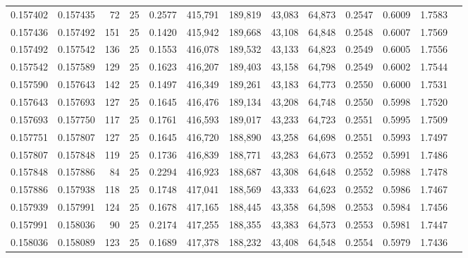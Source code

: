 \begin{tabular}{rrrrrrrrrrrrr}
0.157402 & 0.157435 &    72 &  25 &                                     0.2577 & 415,791 & 189,819 &  43,083 &  64,873 & 0.2547 & 0.6009 & 1.7583 \\
0.157436 & 0.157492 &   151 &  25 &                                     0.1420 & 415,942 & 189,668 &  43,108 &  64,848 & 0.2548 & 0.6007 & 1.7569 \\
0.157492 & 0.157542 &   136 &  25 &                                     0.1553 & 416,078 & 189,532 &  43,133 &  64,823 & 0.2549 & 0.6005 & 1.7556 \\
0.157542 & 0.157589 &   129 &  25 &                                     0.1623 & 416,207 & 189,403 &  43,158 &  64,798 & 0.2549 & 0.6002 & 1.7544 \\
0.157590 & 0.157643 &   142 &  25 &                                     0.1497 & 416,349 & 189,261 &  43,183 &  64,773 & 0.2550 & 0.6000 & 1.7531 \\
0.157643 & 0.157693 &   127 &  25 &                                     0.1645 & 416,476 & 189,134 &  43,208 &  64,748 & 0.2550 & 0.5998 & 1.7520 \\
0.157693 & 0.157750 &   117 &  25 &                                     0.1761 & 416,593 & 189,017 &  43,233 &  64,723 & 0.2551 & 0.5995 & 1.7509 \\
0.157751 & 0.157807 &   127 &  25 &                                     0.1645 & 416,720 & 188,890 &  43,258 &  64,698 & 0.2551 & 0.5993 & 1.7497 \\
0.157807 & 0.157848 &   119 &  25 &                                     0.1736 & 416,839 & 188,771 &  43,283 &  64,673 & 0.2552 & 0.5991 & 1.7486 \\
0.157848 & 0.157886 &    84 &  25 &                                     0.2294 & 416,923 & 188,687 &  43,308 &  64,648 & 0.2552 & 0.5988 & 1.7478 \\
0.157886 & 0.157938 &   118 &  25 &                                     0.1748 & 417,041 & 188,569 &  43,333 &  64,623 & 0.2552 & 0.5986 & 1.7467 \\
0.157939 & 0.157991 &   124 &  25 &                                     0.1678 & 417,165 & 188,445 &  43,358 &  64,598 & 0.2553 & 0.5984 & 1.7456 \\
0.157991 & 0.158036 &    90 &  25 &                                     0.2174 & 417,255 & 188,355 &  43,383 &  64,573 & 0.2553 & 0.5981 & 1.7447 \\
0.158036 & 0.158089 &   123 &  25 &                                     0.1689 & 417,378 & 188,232 &  43,408 &  64,548 & 0.2554 & 0.5979 & 1.7436 \\

\end{tabular}
